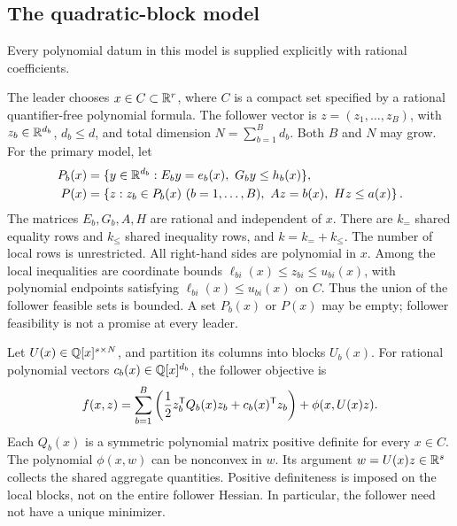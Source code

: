 \subsection{The quadratic-block model}\label{subsec:model}

Every polynomial datum in this model is supplied explicitly with rational
coefficients.

The leader chooses $x\in C\subset\mathbb R^r$, where $C$ is a compact set
specified by a rational quantifier-free polynomial formula. The follower
vector is $z=(z_1,\ldots,z_B)$, with $z_b\in\mathbb R^{d_b}$,
$d_b\le d$, and total dimension $N=\sum_{b=1}^B d_b$. Both $B$ and $N$
may grow. For the primary model, let
\begin{align}
 P_b(x)&=\{y\in\mathbb R^{d_b}:E_b y=e_b(x),\ G_b y\le h_b(x)\},
 \label{eq:local-polytope}\\
 P(x)&=\left\{z:z_b\in P_b(x)\ (b=1,\ldots,B),\
                     Az=b(x),\ Hz\le a(x)\right\}.
 \label{eq:follower-polytope}
\end{align}
The matrices $E_b,G_b,A,H$ are rational and independent of $x$.
There are $k_{=}$ shared equality rows and $k_{\le}$ shared inequality
rows, and $k=k_=+k_{\le}$. The number of local rows is unrestricted.
All right-hand sides are polynomial in $x$. Among the local inequalities
are coordinate bounds
$\ell_{bi}(x)\le z_{bi}\le u_{bi}(x)$, with polynomial endpoints
satisfying $\ell_{bi}(x)\le u_{bi}(x)$ on $C$.
Thus the union of the follower feasible sets is bounded.
A set $P_b(x)$ or $P(x)$ may be empty; follower feasibility is not a
promise at every leader.

Let $U(x)\in\mathbb Q[x]^{s\times N}$, and partition its columns into blocks
$U_b(x)$. For rational polynomial vectors $c_b(x)\in\mathbb Q[x]^{d_b}$,
the follower objective is
\begin{equation}\label{eq:quadratic-objective}
 f(x,z)=\sum_{b=1}^B\left(\frac12 z_b^{\mathsf T} Q_b(x)z_b+
                c_b(x)^{\mathsf T} z_b\right)+\phi(x,U(x)z).
\end{equation}
Each $Q_b(x)$ is a symmetric polynomial matrix positive definite for
every $x\in C$. The polynomial $\phi(x,w)$ can be nonconvex in $w$.
Its argument $w=U(x)z\in\mathbb R^s$ collects the shared aggregate quantities.
Positive definiteness is imposed on the local blocks, not on the entire
follower Hessian. In particular, the follower need not have a unique
minimizer.

